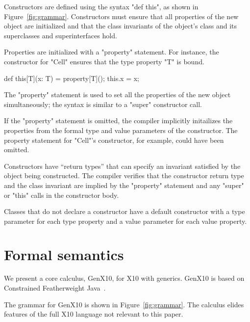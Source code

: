 \documentclass[preprint,nocopyrightspace,9pt]{sigplanconf}
\newcommand\gxx{GenX10\xspace}
\begin{document}
Constructors are defined using the syntax \xcd"def this",
as shown in Figure~\ref{fig:grammar}.
%
Constructors must ensure that all properties of the new object
are initialized and that the class invariants of the object's
class and its superclasses and superinterfaces hold.

Properties are initialized with a \xcd"property" statement.
For instance, the
constructor for \xcd"Cell" ensures that the type property \xcd"T" is bound.
\begin{xten}
    def this[T](x: T) =
      { property[T](); this.x = x; }
\end{xten}
The \xcd"property" statement is used to set all the properties
of the new object simultaneously; the syntax is similar to a \xcd"super"
constructor call.

If the \xcd"property" statement is omitted, the compiler implicitly
initailizes the properties from the formal type and value parameters
of the constructor.  The property statement for \xcd"Cell"'s constructor,
for example, could have been omitted.

Constructors have ``return
types'' that can specify an invariant satisfied by the object being
constructed.  The compiler verifies that the
constructor return type and the class invariant are implied by the
\xcd"property" statement and any \xcd"super"
or \xcd"this" calls in the constructor body.

Classes that do not declare a constructor
have a default constructor with a type parameter for each
type property and a value parameter for each value property.

\section{Formal semantics}

\newcommand\xbar[1]{\ensuremath{\bar{\Xcd{#1}}}}
\newcommand\tbar[1]{\ensuremath{\bar{\tt {#1}}}}
\newcommand\exc[2]{\ensuremath{\exists}#1.~#2}
\newcommand\exty[3]{\ensuremath{\exists}#1\ty#2.~#3}
\newcommand\extyty[5]{\ensuremath{\exists}#1\ty#2,#3\ty#4.~#5}
\newcommand\extytyty[7]{\ensuremath{\exists}#1\ty#2,#3\ty#4,#5\ty#6.~#7}

We present a core calculus, \gxx, for X10 with generics.
\gxx is based on Constrained Featherweight
Java~\cite{constrained-types}.


The grammar for \gxx is shown in 
Figure~\ref{fig:grammar}.  The calculus elides features of the
full X10 language not relevant to this paper.
\end{document}
